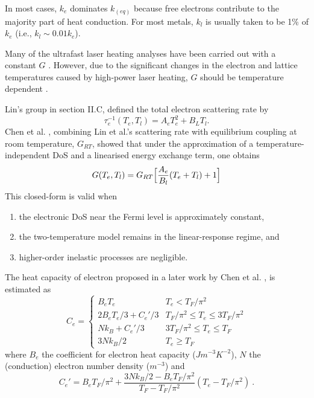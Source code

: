 In most cases, $k_e$ dominates $k_{(eq)}$ because free electrons contribute to the majority part of heat conduction.
For most metals, $k_l$ is usually taken to be 1\% of $k_e$ (i.e., $k_l \sim 0.01 k_e$).

Many of the ultrafast laser heating analyses have been carried out with a constant $G$ \cite{Kaganov_1956, Anisimov_1974, Hopkins_2013}.
However, due to the significant changes in the electron and lattice temperatures caused by high-power laser heating, $G$ should
be temperature dependent \cite{AlMalkawi_2018}.

Lin's group \cite{Lin_2008} in section II.C, defined the total electron scattering rate by
\begin{equation}
  \tau_e^{-1}(T_e, T_l) = A_eT_e^2 + B_LT_l.
  \label{eq:ch1-electron_scattering_rate}
\end{equation}
Chen et al. \cite{Chen_2005}, combining Lin et al.'s \cite{Lin_2008} scattering rate with equilibrium coupling at room temperature, $G_{RT}$,
showed that under the approximation of a temperature-independent DoS and a linearised energy exchange term, one obtains
\begin{equation}
  G(T_e,T_l) = G_{RT} \Bigl[\frac{A_e}{B_l}(T_e + T_l) + 1\Bigr]
  \label{eq:ch1-G_closed_formula}
\end{equation}
This closed-form is valid when
\begin{enumerate}[label=(\roman*)]
  \item the electronic DoS near the Fermi level is approximately constant,
  \item the two-temperature model remains in the linear-response regime, and
  \item higher-order inelastic processes are negligible.
\end{enumerate}

The heat capacity of electron proposed in a later work by Chen et al. \cite{Chen_2006}, is estimated as
\begin{equation}
  C_e = \left\{
  \begin{array}{ll}
    B_eT_e             & T_e < T_F/\pi^2                    \\
    2B_eT_e/3 + C_e'/3 & T_F/\pi^2 \leq T_e \leq 3T_F/\pi^2 \\
    Nk_B + C_e'/3      & 3T_F/\pi^2 \leq T_e \leq T_F       \\
    3Nk_B/2            & T_e \geq T_F
  \end{array}
  \right.
\end{equation}
where $B_e$ the coefficient for electron heat capacity ($Jm^{-3}K^{-2}$), $N$ the (conduction) electron number density ($m^{-3}$) and
\[
  C_e' = B_e T_F/\pi^2 + \frac{3Nk_B/2 - B_e T_F/\pi^2}{T_F - T_F/\pi^2}(T_e - T_F/\pi^2) \ .
\]

